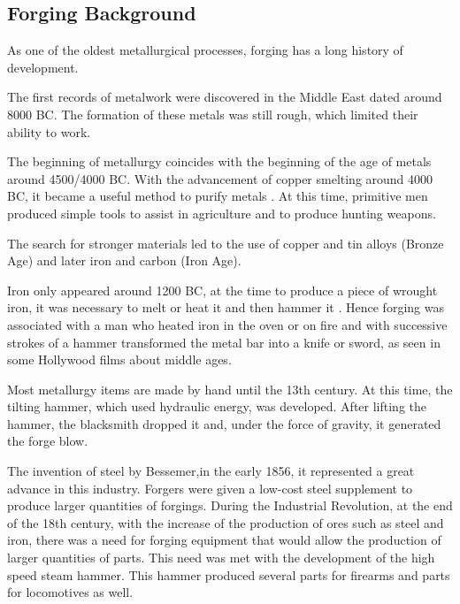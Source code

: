 \subsection{Forging Background}
\indent
As one of the oldest metallurgical processes, forging has a long history of development.\par
The first records of metalwork were discovered in the Middle East dated around 8000 BC. The formation of these metals was still rough, which limited their ability to work. \cite{navarro2006evoluccao} \par
The beginning of metallurgy coincides with the beginning of the age of metals around 4500/4000 BC. With the advancement of copper smelting around 4000 BC, it became a useful method to purify metals \cite{navarro2006evoluccao}. At this time, primitive men produced simple tools to assist in agriculture and to produce hunting weapons.\cite{azom}\par
The search for stronger materials led to the use of copper and tin alloys (Bronze Age) and later iron and carbon (Iron Age).\cite{navarro2006evoluccao} \par
Iron only appeared around 1200 BC, at the time to produce a piece of wrought iron, it was necessary to melt or heat it and then hammer it \cite{navarro2006evoluccao}. Hence forging was associated with a man who heated iron in the oven or on fire and with successive strokes of a hammer transformed the metal bar into a knife or sword, as seen in some Hollywood films about middle ages.\par
Most metallurgy items are made by hand until the 13th century. At this time, the tilting hammer, which used hydraulic energy, was developed. After lifting the hammer, the blacksmith dropped it and, under the force of gravity, it generated the forge blow. \cite{semiatin1988introduction}\par
The invention of steel by Bessemer,in the early 1856, it represented a great advance in this industry. Forgers were given a low-cost steel supplement to produce larger quantities of forgings. \cite{navarro2006evoluccao}
During the Industrial Revolution, at the end of the 18th century, with the increase of the production of ores such as steel and iron, there was a need for forging equipment that would allow the production of larger quantities of parts. This need was met with the development of the high speed steam hammer. This hammer produced several parts for firearms and parts for locomotives as well. \cite{semiatin1988introduction}\par
